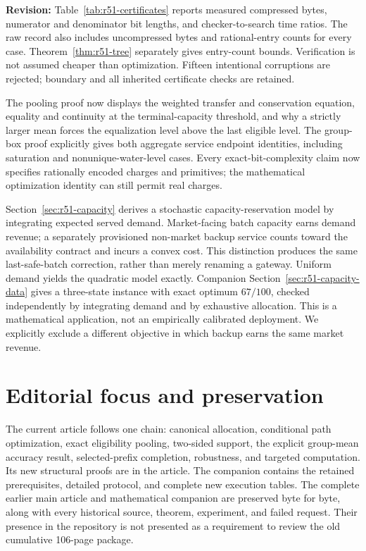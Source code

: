 \documentclass[11pt,letterpaper]{article}
\begin{document}
\textbf{Revision:} Table~\ref{tab:r51-certificates} reports measured compressed bytes, numerator and denominator bit lengths, and checker-to-search time ratios. The raw record also includes uncompressed bytes and rational-entry counts for every case. Theorem~\ref{thm:r51-tree} separately gives entry-count bounds. Verification is not assumed cheaper than optimization. Fifteen intentional corruptions are rejected; boundary and all inherited certificate checks are retained.

The pooling proof now displays the weighted transfer and conservation equation, equality and continuity at the terminal-capacity threshold, and why a strictly larger mean forces the equalization level above the last eligible level. The group-box proof explicitly gives both aggregate service endpoint identities, including saturation and nonunique-water-level cases. Every exact-bit-complexity claim now specifies rationally encoded charges and primitives; the mathematical optimization identity can still permit real charges.

Section~\ref{sec:r51-capacity} derives a stochastic capacity-reservation model by integrating expected served demand. Market-facing batch capacity earns demand revenue; a separately provisioned non-market backup service counts toward the availability contract and incurs a convex cost. This distinction produces the same last-safe-batch correction, rather than merely renaming a gateway. Uniform demand yields the quadratic model exactly. Companion Section~\ref{sec:r51-capacity-data} gives a three-state instance with exact optimum $67/100$, checked independently by integrating demand and by exhaustive allocation. This is a mathematical application, not an empirically calibrated deployment. We explicitly exclude a different objective in which backup earns the same market revenue.

\section{Editorial focus and preservation}
The current article follows one chain: canonical allocation, conditional path optimization, exact eligibility pooling, two-sided support, the explicit group-mean accuracy result, selected-prefix completion, robustness, and targeted computation. Its new structural proofs are in the article. The companion contains the retained prerequisites, detailed protocol, and complete new execution tables. The complete earlier main article and mathematical companion are preserved byte for byte, along with every historical source, theorem, experiment, and failed request. Their presence in the repository is not presented as a requirement to review the old cumulative 106-page package.
\end{document}
